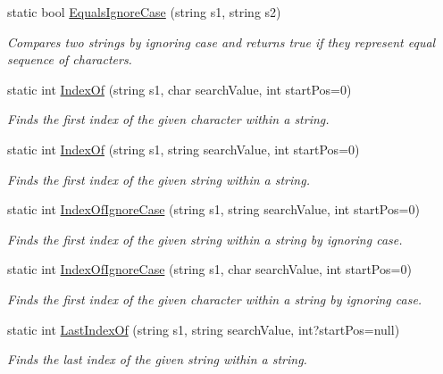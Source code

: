 \begin{DoxyCompactItemize}
static bool \hyperlink{class_ultimate_1_1_utilities_1_1_string_utils_af99925dfec44f9cc6802c8143d061ab1}{Equals\+Ignore\+Case} (string s1, string s2)
\begin{DoxyCompactList}\small\item\em Compares two strings by ignoring case and returns true if they represent equal sequence of characters. \end{DoxyCompactList}\item 
static int \hyperlink{class_ultimate_1_1_utilities_1_1_string_utils_a4c6b57fb028099b06720fb090a2dd7ae}{Index\+Of} (string s1, char search\+Value, int start\+Pos=0)
\begin{DoxyCompactList}\small\item\em Finds the first index of the given character within a string. \end{DoxyCompactList}\item 
static int \hyperlink{class_ultimate_1_1_utilities_1_1_string_utils_ad3a3050d472c5d21a77fd14441b4718a}{Index\+Of} (string s1, string search\+Value, int start\+Pos=0)
\begin{DoxyCompactList}\small\item\em Finds the first index of the given string within a string. \end{DoxyCompactList}\item 
static int \hyperlink{class_ultimate_1_1_utilities_1_1_string_utils_aec3d4d0bb64df32550c49214c7f2cb3a}{Index\+Of\+Ignore\+Case} (string s1, string search\+Value, int start\+Pos=0)
\begin{DoxyCompactList}\small\item\em Finds the first index of the given string within a string by ignoring case. \end{DoxyCompactList}\item 
static int \hyperlink{class_ultimate_1_1_utilities_1_1_string_utils_a77192314b0ba1302e3181c03568093e7}{Index\+Of\+Ignore\+Case} (string s1, char search\+Value, int start\+Pos=0)
\begin{DoxyCompactList}\small\item\em Finds the first index of the given character within a string by ignoring case. \end{DoxyCompactList}\item 
static int \hyperlink{class_ultimate_1_1_utilities_1_1_string_utils_aa635a8aafef1d6bc2045fd1d0320a930}{Last\+Index\+Of} (string s1, string search\+Value, int?start\+Pos=null)
\begin{DoxyCompactList}\small\item\em Finds the last index of the given string within a string. \end{DoxyCompactList}\item 

\end{DoxyCompactItemize}
